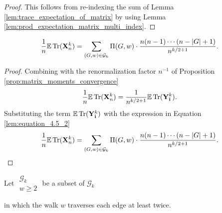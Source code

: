 \begin{proof}
  This follows from re-indexing the sum of Lemma \ref{lem:trace_expectation_of_matrix} by using Lemma \ref{lem:prod_expectation_matrix_multi_index}.
\end{proof}
\begin{lemma}
  \label{lem:equation_4.5_3}
  \[
  \frac{1}{n} \mathbb{E} \operatorname{Tr} (\mathbf{X}_n^k) = \sum_{(G,w) \in \mathcal{G}_k} \Pi (G,w) \cdot \frac{n (n-1) \cdots (n - |G| + 1)}{n^{k/2+1}}.
  \]
\end{lemma}
\begin{proof}
  Combining with the renormalization factor $n^{-1}$ of Proposition \ref{prop:matrix_moments_convergence}
  \[
  \frac{1}{n} \mathbb{E} \operatorname{Tr} (\mathbf{X}_n^k) = \frac{1}{n^{k/2+1}} \mathbb{E} \operatorname{Tr} (\mathbf{Y}_\mathbf{i}^k).
  \]
  Substituting the term $\mathbb{E} \operatorname{Tr} (\mathbf{Y}_\mathbf{i}^k)$ with the expression in Equation \ref{lem:equation_4.5_2}
  \[
  \frac{1}{n} \mathbb{E} \operatorname{Tr} (\mathbf{X}_n^k) = \sum_{\substack{(G,w) \in \mathcal{G}_k}} \Pi (G,w) \cdot \frac{n (n-1) \cdots (n - |G| + 1)}{n^{k/2+1}}.
  \]
\end{proof}

\begin{definition}
  \label{def:g_k_ge_2}

Let $\substack{\mathcal{G}_k \\ w \geq 2}$ be a subset of $\mathcal{G}_k$ 

  in which the walk $w$ traverses each edge at least twice.
\end{definition}




